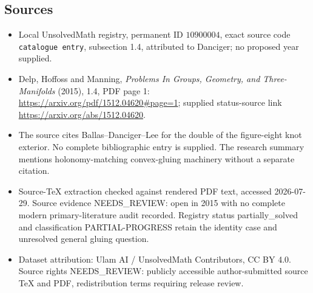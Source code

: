 \documentclass[11pt]{article}
\begin{document}
\subsection{Sources}
\begin{itemize}
\item Local UnsolvedMath registry, permanent ID \(10900004\), exact source code \texttt{catalogue entry}, subsection 1.4, attributed to Danciger; no proposed year supplied.
\item Delp, Hoffoss and Manning, \emph{Problems In Groups, Geometry, and Three-Manifolds} (2015), 1.4, PDF page 1: \url{https://arxiv.org/pdf/1512.04620#page=1}; supplied status-source link \url{https://arxiv.org/abs/1512.04620}.
\item The source cites Ballas--Danciger--Lee for the double of the figure-eight knot exterior. No complete bibliographic entry is supplied. The research summary mentions holonomy-matching convex-gluing machinery without a separate citation.
\item Source-TeX extraction checked against rendered PDF text, accessed 2026-07-29. Source evidence NEEDS\_REVIEW: open in 2015 with no complete modern primary-literature audit recorded. Registry status partially\_solved and classification PARTIAL-PROGRESS retain the identity case and unresolved general gluing question.
\item Dataset attribution: Ulam AI / UnsolvedMath Contributors, CC BY 4.0. Source rights NEEDS\_REVIEW: publicly accessible author-submitted source TeX and PDF, redistribution terms requiring release review.
\end{itemize}
\end{document}

